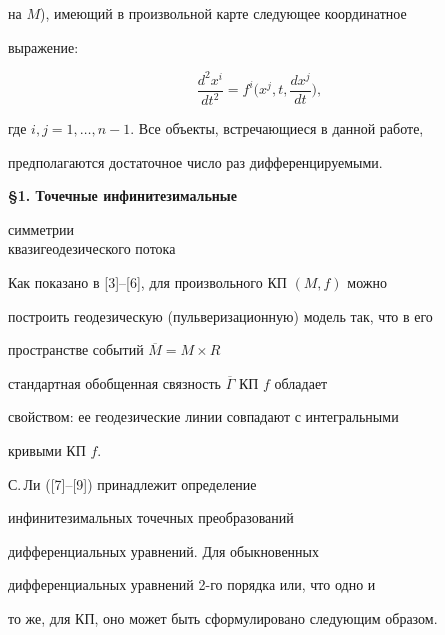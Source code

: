 на $M$), имеющий в произвольной карте следующее координатное


выражение:


$$


\frac{d^2 x^i}{dt^2}=f^i\bigg(x^j,t,\frac{dx^j}{dt}\bigg),


$$


где $i,j=1,\dotsc,n-1$. Все объекты, встречающиеся в данной работе,


предполагаются достаточное число раз дифференцируемыми.


\medskip





\begin{center}


{\bf \S 1. Точечные инфинитезимальные


симметрии \\


квазигеодезического потока}


\end{center}


\medskip








Как показано в [3]--[6], для произвольного КП $(M,f) $ можно


построить геодезическую (пульверизационную) модель так, что в его


пространстве событий $\overline{M}=M\times R$ 


стандартная обобщенная связность $\overline{\Gamma}$ КП $f$ обладает


свойством: ее геодезические линии совпадают с интегральными


кривыми КП $f$.





С.\,Ли ([7]--[9]) принадлежит определение


инфинитезимальных точечных преобразований


дифференциальных уравнений. Для обыкновенных


дифференциальных уравнений 2-го порядка или, что одно и


то же, для КП, оно может быть сформулировано следующим образом.





